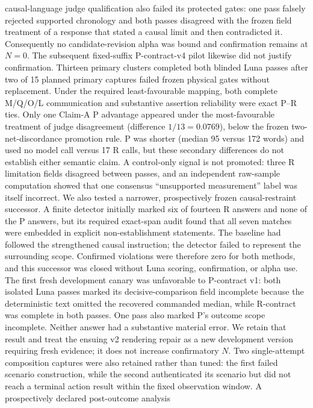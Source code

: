 \documentclass[conference]{IEEEtran}
\begin{document}
causal-language judge qualification also failed its protected gates: one pass falsely rejected
supported chronology and both passes disagreed with the frozen field treatment of a response that
stated a causal limit and then contradicted it. Consequently no candidate-revision alpha was bound
and confirmation remains at $N=0$.
The subsequent fixed-suffix P-contract-v4 pilot likewise did not justify confirmation. Thirteen
primary clusters completed both blinded Luna passes after two of 15 planned primary captures
failed frozen physical gates without replacement. Under the required least-favourable mapping,
both complete M/Q/O/L communication and substantive assertion reliability were exact P--R ties.
Only one Claim-A P advantage appeared under the most-favourable treatment of judge disagreement
(difference $1/13=0.0769$), below the frozen two-net-discordance promotion rule. P was shorter
(median 95 versus 172 words) and used no model call versus 17 R calls, but these secondary
differences do not establish either semantic claim. A control-only signal is not promoted: three
R limitation fields disagreed between passes, and an independent raw-sample computation showed
that one consensus ``unsupported measurement'' label was itself incorrect.
We also tested a narrower, prospectively frozen causal-restraint successor. A finite detector
initially marked six of fourteen R answers and none of the P answers, but its required exact-span
audit found that all seven matches were embedded in explicit non-establishment statements. The
baseline had followed the strengthened causal instruction; the detector failed to represent the
surrounding scope. Confirmed violations were therefore zero for both methods, and this successor
was closed without Luna scoring, confirmation, or alpha use.
The first fresh development canary was unfavorable to P-contract v1: both isolated Luna passes
marked its decisive-comparison field incomplete because the deterministic text omitted the
recovered commanded median, while R-contract was complete in both passes. One pass also marked
P's outcome scope incomplete. Neither answer had a substantive material error. We retain that
result and treat the ensuing v2 rendering repair as a new development version requiring fresh
evidence; it does not increase confirmatory $N$.
Two single-attempt composition captures were also retained rather than tuned: the first failed
scenario construction, while the second authenticated its scenario but did not reach a terminal
action result within the fixed observation window. A prospectively declared post-outcome analysis
\end{document}
